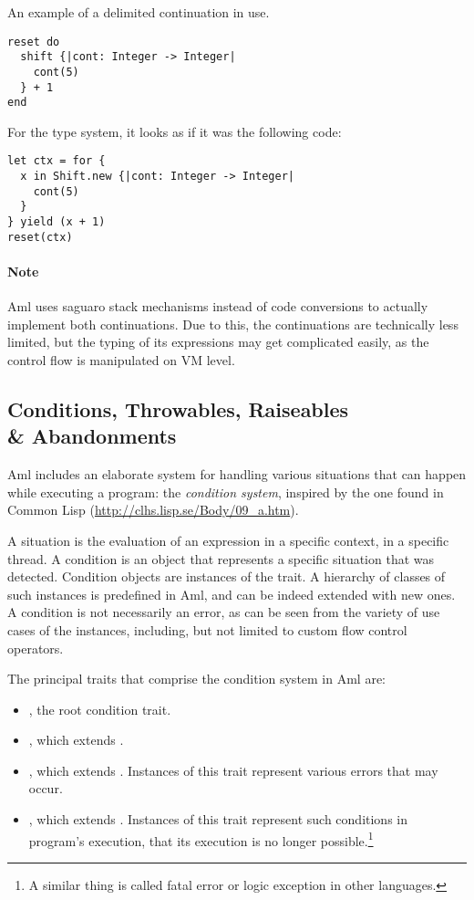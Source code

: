 \example An example of a delimited continuation in use. 
\begin{lstlisting}
reset do
  shift {|cont: Integer -> Integer|
    cont(5)
  } + 1
end
\end{lstlisting}
For the type system, it looks as if it was the following code:
\begin{lstlisting}
let ctx = for {
  x in Shift.new {|cont: Integer -> Integer|
    cont(5)
  }
} yield (x + 1)
reset(ctx)
\end{lstlisting}

\paragraph{Note}
Aml uses saguaro stack mechanisms instead of code conversions to actually implement both continuations. Due to this, the continuations are technically less limited, but the typing of its expressions may get complicated easily, as the control flow is manipulated on VM level.






\subsection[Conditions, Throwables, Raiseables \& Abandonments]{Conditions, Throwables, Raiseables\\\& Abandonments}

Aml includes an elaborate system for handling various situations that can happen while executing a program: the {\em condition system}, inspired by the one found in Common Lisp (\url{http://clhs.lisp.se/Body/09_a.htm}). 

A situation is the evaluation of an expression in a specific context, in a specific thread. A condition is an object that represents a specific situation that was detected. Condition objects are instances of the  trait. A hierarchy of classes of such instances is predefined in Aml, and can be indeed extended with new ones. A condition is not necessarily an error, as can be seen from the variety of use cases of the instances, including, but not limited to custom flow control operators. 

The principal traits that comprise the condition system in Aml are: 
\begin{itemize}
  \item {}, the root condition trait. 
  \item {}, which extends . 
  \item {}, which extends . Instances of this trait represent various errors that may occur. 
  \item {}, which extends . Instances of this trait represent such conditions in program's execution, that its execution is no longer possible.\footnote{A similar thing is called fatal error or logic exception in other languages.}
\end{itemize}

